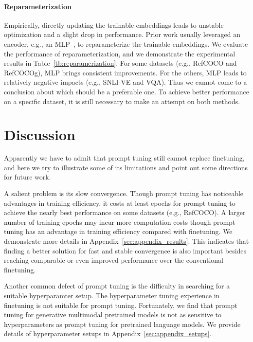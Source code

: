 \documentclass[11pt]{article}
\begin{document}
\paragraph{Reparameterization}
Empirically, directly updating the trainable embeddings leads to unstable optimization and a slight drop in performance. 
Prior work usually leveraged an encoder, e.g., an MLP~\citep{prefix_tuning}, to reparameterize the trainable embeddings. We evaluate the performance of reparameterization, and we demonstrate the experimental results in Table~\ref{tb:reparamerization}. For some datasets (e.g., RefCOCO and RefCOCOg), MLP brings consistent improvements.
For the others, MLP leads to relatively negative impacts (e.g., SNLI-VE and VQA). 
Thus we cannot come to a conclusion about which should be a preferable one. To achieve better performance on a specific dataset, it is still necessary to make an attempt on both methods. 







 
\section{Discussion}
Apparently we have to admit that prompt tuning still cannot replace finetuning, and here we try to illustrate some of its limitations and point out some directions for future work. 

A salient problem is its slow convergence. 
Though prompt tuning has noticeable advantages in training efficiency, 
it costs at least  epochs for prompt tuning to achieve the nearly best performance on some datasets (e.g., RefCOCO). 
A larger number of training epochs may incur more computation costs though prompt tuning has an advantage in training efficiency compared with finetuning. 
We demonstrate more details in Appendix~\ref{sec:appendix_results}. 
This indicates that finding a better solution for fast and stable convergence is also important besides reaching comparable or even improved performance over the conventional finetuning. 

Another common defect of prompt tuning is the difficulty in searching for a suitable hyperparamter setup. The hyperparameter tuning experience in finetuning is not suitable for prompt tuning. Fortunately, we find that prompt tuning for generative multimodal pretrained models is not as sensitive to hyperparameters as prompt tuning for pretrained language models. We provide details of hyperparameter setups in Appendix~\ref{sec:appendix_setups}. 
\end{document}
